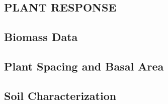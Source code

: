 \documentclass[fleqn]{class/Moffetttuthes}
\begin{document}
\begin{appendix}
  \renewcommand{\thesection}{\Alph{chapter}.\arabic{section}}
  \renewcommand{\thetable}{\Alph{chapter}.\arabic{table}}
  \renewcommand{\thefigure}{\Alph{chapter}.\arabic{figure}}
  \renewcommand{\theequation}{\Alph{chapter}.\arabic{equation}}

\chapter{PLANT RESPONSE}

\section{Biomass Data}
\begin{singlespace}
\begin{scriptsize}
\begin{landscape}

\end{landscape}
\end{scriptsize}
\end{singlespace}

\section{Plant Spacing and Basal Area}
\begin{singlespace}
\begin{scriptsize}
\begin{landscape}

\end{landscape}
\end{scriptsize}
\end{singlespace}



\section{Soil Characterization}
\begin{singlespace}
\begin{landscape}

\end{landscape}
\end{singlespace}


\end{appendix}
\end{document}
